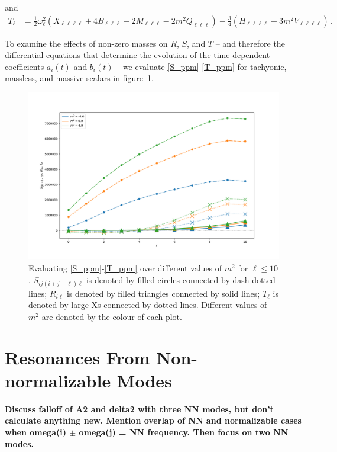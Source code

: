 \documentclass[letterpaper,11pt]{article}
\newcommand{\ol}{\omega_\ell}
\begin{document}
and
\begin{align}
\label{T_ppm}
T_{\ell} &= \frac{1}{2} \ol^2 \left( X_{\ell \ell \ell \ell} + 4 B_{\ell \ell \ell} -2 M_{\ell \ell \ell} - 2m^2 Q_{\ell \ell \ell} \right) -\frac{3}{4} \left( H_{\ell \ell \ell \ell} + 3m^2 V_{\ell \ell \ell \ell} \right) \, .
\end{align}

To examine the effects of non-zero masses on $R$, $S$, and $T$ -- and therefore the differential equations that determine the evolution of the time-dependent coefficients $a_i(t)$ and $b_i(t)$ -- we evaluate \eqref{S_ppm}-\eqref{T_ppm} for tachyonic, massless, and massive scalars in figure~\ref{fig: Nmodes}.

\begin{figure}
\centering
	\includegraphics[width=\textwidth]{./figures/Nmodesplot}
	\caption{Evaluating \eqref{S_ppm}-\eqref{T_ppm} over different values of $m^2$ for $\ell \leq 10$. $S_{ij(i+j-\ell)\ell}$ is denoted by filled circles connected by dash-dotted lines; $R_{i\ell}$ is denoted by filled triangles connected by solid lines; $T_{\ell}$ is denoted by large Xs connected by dotted lines. Different values of $m^2$ are denoted by the colour of each plot.}
	\label{fig: Nmodes}
\end{figure}



\section{Resonances From Non-normalizable Modes}
\label{sec: NNmodes}

\begin{center}
{\bf Discuss falloff of A2 and delta2 with three NN modes, but don't calculate anything new. Mention overlap of NN and normalizable cases when omega(i) $\pm$ omega(j) = NN frequency. Then focus on two NN modes.}
\end{center}
\end{document}
